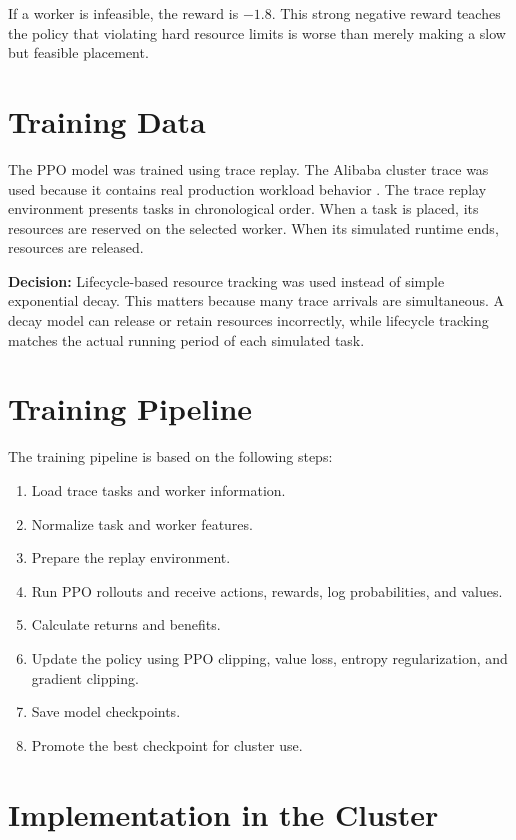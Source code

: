 If a worker is infeasible, the reward is \(-1.8\). This strong negative reward teaches the policy that violating hard resource limits is worse than merely making a slow but feasible placement.

\section{Training Data}

The PPO model was trained using trace replay. The Alibaba cluster trace was used because it contains real production workload behavior \cite{alibabatrace}. The trace replay environment presents tasks in chronological order. When a task is placed, its resources are reserved on the selected worker. When its simulated runtime ends, resources are released.

\textbf{Decision:} Lifecycle-based resource tracking was used instead of simple exponential decay. This matters because many trace arrivals are simultaneous. A decay model can release or retain resources incorrectly, while lifecycle tracking matches the actual running period of each simulated task.

\section{Training Pipeline}

The training pipeline is based on the following steps:

\begin{enumerate}
    \item Load trace tasks and worker information.
    \item Normalize task and worker features.
    \item Prepare the replay environment.
    \item Run PPO rollouts and receive actions, rewards, log probabilities, and values.
    \item Calculate returns and benefits.
    \item Update the policy using PPO clipping, value loss, entropy regularization, and gradient clipping.
    \item Save model checkpoints.
    \item Promote the best checkpoint for cluster use.
\end{enumerate}

\section{Implementation in the Cluster}

